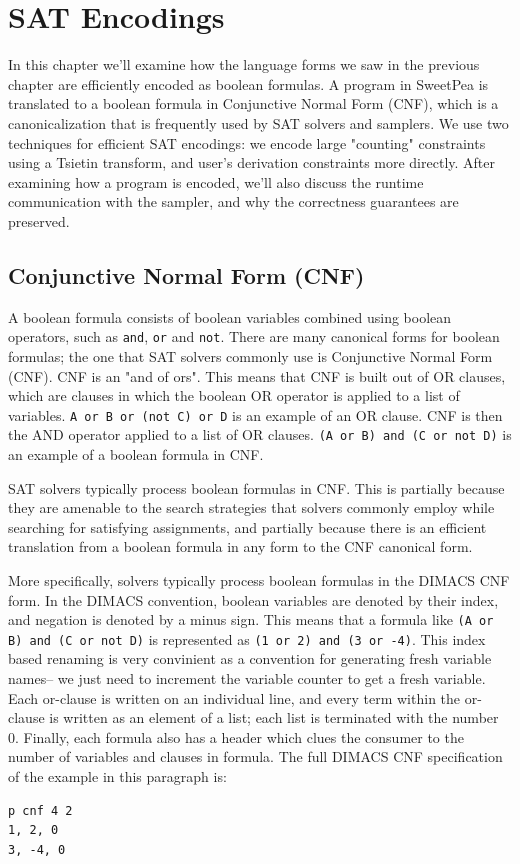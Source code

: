 
\chapter{SAT Encodings}

In this chapter we'll examine how the language forms we saw in the previous chapter are efficiently encoded as boolean formulas. A program in SweetPea is translated to a boolean formula in Conjunctive Normal Form (CNF), which is a canonicalization that is frequently used by SAT solvers and samplers. We use two techniques for efficient SAT encodings: we encode large "counting" constraints using a Tsietin transform, and user's derivation constraints more directly. After examining how a program is encoded, we'll also discuss the runtime communication with the sampler, and why the correctness guarantees are preserved.

\section{Conjunctive Normal Form (CNF)}

A boolean formula consists of boolean variables combined using boolean operators, such as \texttt{and}, \texttt{or} and \texttt{not}. There are many canonical forms for boolean formulas; the one that SAT solvers commonly use is Conjunctive Normal Form (CNF). CNF is an "and of ors". This means that CNF is built out of OR clauses, which are clauses in which the boolean OR operator is applied to a list of variables. \texttt{A or B or (not C) or D} is an example of an OR clause. CNF is then the AND operator applied to a list of OR clauses. \texttt{(A or B) and (C or not D)} is an example of a boolean formula in CNF.

SAT solvers typically process boolean formulas in CNF. This is partially because they are amenable to the search strategies that solvers commonly employ while searching for satisfying assignments, and partially because there is an efficient translation from a boolean formula in any form to the CNF canonical form.

More specifically, solvers typically process boolean formulas in the DIMACS CNF form. In the DIMACS convention, boolean variables are denoted by their index, and negation is denoted by a minus sign. This means that a formula like \texttt{(A or B) and (C or not D)} is represented as \texttt{(1 or 2) and (3 or -4)}. This index based renaming is very convinient as a convention for generating fresh variable names-- we just need to increment the variable counter to get a fresh variable. Each or-clause is written on an individual line, and every term within the or-clause is written as an element of a list; each list is terminated with the number 0. Finally, each formula also has a header which clues the consumer to the number of variables and clauses in formula. The full DIMACS CNF specification of the example in this paragraph is:
\begin{verbatim}
p cnf 4 2
1, 2, 0
3, -4, 0
\end{verbatim}

